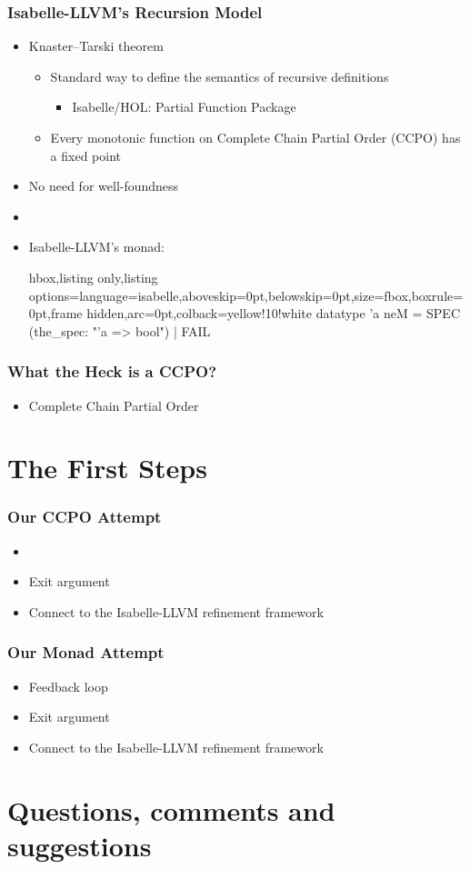 \documentclass[aspectratio=169,10pt]{beamer}
\begin{document}
\begin{frame}[fragile]
  \frametitle{Isabelle-LLVM's Recursion Model}
  \begin{itemize}
    \item Knaster–Tarski theorem
          \begin{itemize}
            \item Standard way to define the semantics of recursive definitions
                  \begin{itemize}
                    \item Isabelle/HOL: Partial Function Package
                  \end{itemize}
            \item Every monotonic function on Complete Chain Partial Order (CCPO) has a fixed point
          \end{itemize}
    \item No need for well-foundness
    \item
    \item Isabelle-LLVM's monad:
          \vspace*{-1ex}
          \begin{tcblisting}{hbox,listing only,listing options={language=isabelle,aboveskip=0pt,belowskip=0pt},size=fbox,boxrule=0pt,frame hidden,arc=0pt,colback=yellow!10!white}
datatype 'a neM = SPEC (the_spec: "'a => bool") | FAIL
          \end{tcblisting}
          \vspace*{-1ex}
  \end{itemize}
\end{frame}

\begin{frame}[fragile]
  \frametitle{What the Heck is a CCPO?}
  \begin{itemize}
    \item Complete Chain Partial Order
  \end{itemize}
\end{frame}

\section{The First Steps}

\begin{frame}[fragile]
  \frametitle{Our CCPO Attempt}
  \begin{itemize}
    \item
    \item Exit argument
    \item Connect to the Isabelle-LLVM refinement framework
  \end{itemize}
\end{frame}

\begin{frame}[fragile]
  \frametitle{Our Monad Attempt}
  \begin{itemize}
    \item Feedback loop
    \item Exit argument
    \item Connect to the Isabelle-LLVM refinement framework
  \end{itemize}
\end{frame}

\section{Questions, comments and suggestions}
\end{document}
